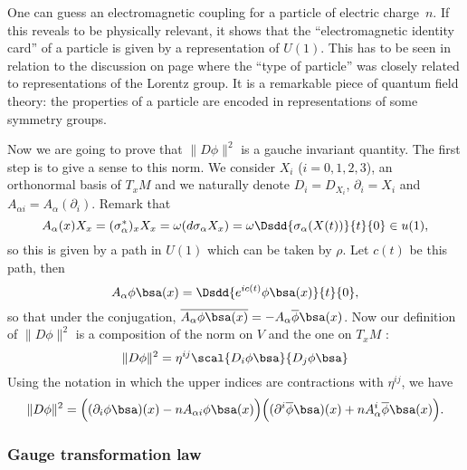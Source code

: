 One can guess an electromagnetic coupling for a particle of electric charge~$n$. If this reveals to be physically relevant, it shows that the ``electromagnetic identity card'' of a particle is given by a representation of $U(1)$. This has to be seen in relation to the discussion on page \pageref{pg:phyz_reprez} where the ``type of particle'' was closely related to representations of the Lorentz group. It is a remarkable piece of quantum field theory: the properties of a particle are encoded in representations of some symmetry groups.

Now we are going to prove that $\|D\phi\|^2$ is a gauche invariant quantity. The first step is to give a sense to this norm. We consider $X_i$ ($i=0,1,2,3$), an orthonormal basis of $T_xM$ and we naturally denote $D_i=D_{X_i}$, $\partial_i=X_i$ and $A_{\alpha i}=A_{\alpha}(\partial_i)$. Remark that 
\begin{equation}
   A_{\alpha}(x)X_x=(\sigma_{\alpha}^*)_xX_x
                 =\omega( d\sigma_{\alpha} X_x )
                 =\omega\Dsdd{ \sigma_{\alpha}(X(t)) }{t}{0}\in u(1),
\end{equation}
so this is given by a path in $U(1)$ which can be taken by $\rho$. Let $c(t)$ be this path, then
\[
   A_{\alpha}\phi\bsa(x)=\Dsdd{ e^{ic(t)}\phi\bsa(x) }{t}{0},
\]
so that under the conjugation, $\overline{A_{\alpha}\phi\bsa(x)}=-A_{\alpha}\overline{ \phi }\bsa(x)$. Now our definition of $\|D\phi\|^2$ is a composition of the norm on $V$ and the one on $T_xM$ :
\begin{equation}
  \|D\phi\|^2=\eta^{ij}\scal{ D_i\phi\bsa }{D_j\phi\bsa}
\end{equation}
Using the notation in which the upper indices are contractions with $\eta^{ij}$, we have
\[
\|D\phi\|^2=\Big(  (\partial_i\phi\bsa)(x)-nA_{\alpha i}\phi\bsa(x)   \Big)
            \Big(  (\partial^i\overline{ \phi }\bsa)(x)+nA_{\alpha}^i\overline{ \phi }\bsa(x)   \Big).
\]

\subsubsection{Gauge transformation law}

